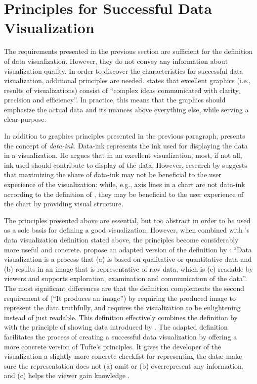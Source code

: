\section{Principles for Successful Data Visualization}
\label{section:visualizationprinciples}

The requirements presented in the previous section are sufficient for the definition of data visualization. However, they do not convey any information about visualization quality. In order to discover the characteristics for successful data visualization, additional principles are needed. \citet[p.~13]{tufte_visual_1986} states that excellent graphics (i.e., results of visualizations) consist of ``complex ideas communicated with clarity, precision and efficiency''. In practice, this means that the graphics should emphasize the actual data and its nuances above everything else, while serving a clear purpose.

In addition to graphics principles presented in the previous paragraph, \citet[p.~93]{tufte_visual_1986} presents the concept of \emph{data-ink}. Data-ink represents the ink used for displaying the data in a visualization. He argues that in an excellent visualization, most, if not all, ink used should contribute to display of the data. However, research by \citet{inbar_minimalism_2007} suggests that maximizing the share of data-ink may not be beneficial to the user experience of the visualization: while, e.g., axis lines in a chart are not data-ink according to the definition of \citeauthor{tufte_visual_1986}, they may be beneficial to the user experience of the chart by providing visual structure.

The principles presented above are essential, but too abstract in order to be used as a sole basis for defining a good visualization. However, when combined with \citeauthor{kosara_visualization_2007}'s data visualization definition stated above, the principles become considerably more useful and concrete. \citet{azzam_j-b_2013} propose an adapted version of the definition by \citet{kosara_visualization_2007}: ``Data visualization is a process that (a) is based on qualitative or quantitative data and (b) results in an image that is representative of raw data, which is (c) readable by viewers and supports exploration, examination and communication of the data''. The most significant differences are that the definition complements the second requirement of \citeauthor{kosara_visualization_2007} (``It produces an image'') by requiring the produced image to represent the data truthfully, and requires the visualization to be enlightening instead of just readable. This definition effectively combines the definition by \citet{kosara_visualization_2007} with the principle of showing data introduced by \citet{tufte_visual_1986}. The adapted definition facilitates the process of creating a successful data visualization by offering a more concrete version of Tufte's principles. It gives the developer of the visualization a slightly more concrete checklist for representing the data: make sure the representation does not (a) omit or (b) overrepresent any information, and (c) helps the viewer gain knowledge \citep{azzam_j-b_2013}.


